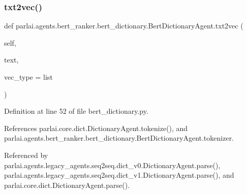 \subsubsection{\texorpdfstring{txt2vec()}{txt2vec()}}
{\footnotesize\ttfamily def parlai.\+agents.\+bert\+\_\+ranker.\+bert\+\_\+dictionary.\+Bert\+Dictionary\+Agent.\+txt2vec (\begin{DoxyParamCaption}\item[{}]{self,  }\item[{}]{text,  }\item[{}]{vec\+\_\+type = {\ttfamily list} }\end{DoxyParamCaption})}



Definition at line 52 of file bert\+\_\+dictionary.\+py.



References parlai.\+core.\+dict.\+Dictionary\+Agent.\+tokenize(), and parlai.\+agents.\+bert\+\_\+ranker.\+bert\+\_\+dictionary.\+Bert\+Dictionary\+Agent.\+tokenizer.



Referenced by parlai.\+agents.\+legacy\+\_\+agents.\+seq2seq.\+dict\+\_\+v0.\+Dictionary\+Agent.\+parse(), parlai.\+agents.\+legacy\+\_\+agents.\+seq2seq.\+dict\+\_\+v1.\+Dictionary\+Agent.\+parse(), and parlai.\+core.\+dict.\+Dictionary\+Agent.\+parse().


